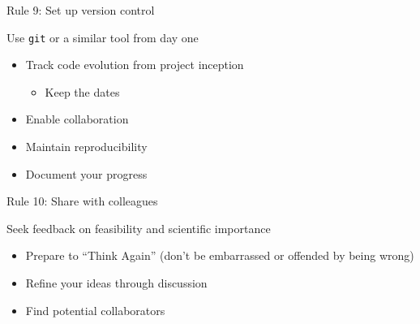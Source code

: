 \documentclass[
  12pt,
  ignorenonframetext,
  aspectratio=169]{beamer}
\providecommand{\tightlist}{%
  \setlength{\itemsep}{0pt}\setlength{\parskip}{0pt}}
\begin{document}
\begin{frame}[fragile]{Rule 9: Set up version control}
\protect{}\label{rule-9-set-up-version-control}
\Large

Use \texttt{git} or a similar tool from day one

\normalsize

\vfill

\begin{itemize}
\item
  Track code evolution from project inception

  \begin{itemize}
  \tightlist
  \item
    Keep the dates
  \end{itemize}
\item
  Enable collaboration
\item
  Maintain reproducibility
\item
  Document your progress
\end{itemize}
\end{frame}

\begin{frame}{Rule 10: Share with colleagues}
\protect{}\label{rule-10-share-with-colleagues}
\Large

Seek feedback on feasibility and scientific importance

\normalsize

\vfill

\begin{itemize}
\item
  Prepare to ``Think Again'' (don't be embarrassed or offended by being
  wrong)
\item
  Refine your ideas through discussion
\item
  Find potential collaborators
\end{itemize}
\end{frame}
\end{document}
